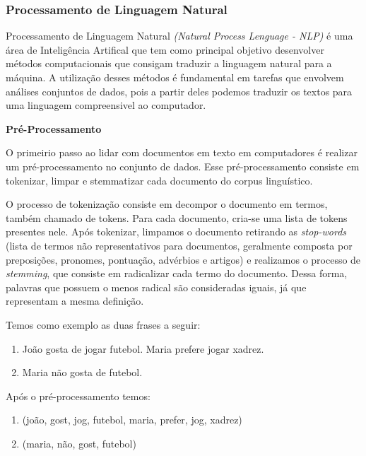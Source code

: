 \documentclass[a4paper,12pt]{article}
\begin{document}
 
\subsubsection{Processamento de Linguagem Natural}
\label{sec:nlp}

Processamento de Linguagem Natural \textit{(Natural Process Lenguage - NLP)} é uma área de Inteligência Artifical que tem como principal
objetivo desenvolver métodos computacionais que consigam traduzir a linguagem natural para a máquina. A utilização desses
métodos é fundamental em tarefas que envolvem análises conjuntos de dados, pois a partir deles podemos
traduzir os textos para uma linguagem compreensivel ao computador.

\begin{description}
  \item \textbf{Pré-Processamento}
  
    O primeirio passo ao lidar com documentos em texto em computadores é realizar um pré-processamento no conjunto de dados. Esse 
    pré-processamento consiste em  tokenizar, limpar e stemmatizar cada documento do corpus linguístico. 
    
    O processo de tokenização consiste em decompor o documento em termos, também chamado de  tokens. Para cada documento, cria-se uma lista de 
    tokens presentes nele. Após tokenizar, limpamos o documento retirando  as \textit{stop-words} (lista de termos não representativos para
    documentos, geralmente composta por preposições, pronomes, pontuação, advérbios e artigos) e realizamos o processo de 
    \textit{stemming}, que consiste em radicalizar cada termo do documento. Dessa forma, palavras que possuem o menos radical são consideradas
    iguais, já que representam a mesma definição.
    
    Temos como exemplo as duas frases a seguir:
    
    \begin{center}
      \begin{enumerate}
	\item João gosta de jogar futebol. Maria prefere jogar xadrez.
	\item Maria não gosta de futebol.
      \end{enumerate}
    \end{center}
    

    Após o pré-processamento temos:
    
    \begin{center}
      \begin{enumerate}
	\item (joão, gost, jog, futebol, maria, prefer, jog, xadrez)
	\item (maria, não, gost, futebol)
      \end{enumerate}
    \end{center}
    

\end{description}
\end{document}
